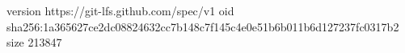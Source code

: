 version https://git-lfs.github.com/spec/v1
oid sha256:1a365627ce2dc08824632cc7b148c7f145c4e0e51b6b011b6d127237fc0317b2
size 213847
